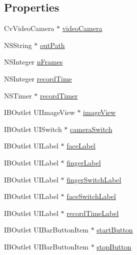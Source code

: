 \subsection*{Properties}
\begin{DoxyCompactItemize}
\item 
Cv\+Video\+Camera $\ast$ \hyperlink{category_m_h_r_main_view_controller_07_08_a82652cbbdc0ac312a50c591870b579c1}{video\+Camera}
\item 
N\+S\+String $\ast$ \hyperlink{category_m_h_r_main_view_controller_07_08_acf930d5712d9bba15886bab49c00f36c}{out\+Path}
\item 
N\+S\+Integer \hyperlink{category_m_h_r_main_view_controller_07_08_aff8ddd68733b8b626fc832ebf2390398}{n\+Frames}
\item 
N\+S\+Integer \hyperlink{category_m_h_r_main_view_controller_07_08_ac15f6b287a439206e9a1a8816248f635}{record\+Time}
\item 
N\+S\+Timer $\ast$ \hyperlink{category_m_h_r_main_view_controller_07_08_a1f1639552968eeba13ed2b4575bea129}{record\+Timer}
\item 
I\+B\+Outlet U\+I\+Image\+View $\ast$ \hyperlink{category_m_h_r_main_view_controller_07_08_ad4a109ef255380e19bcda3c2efb2ce83}{image\+View}
\item 
I\+B\+Outlet U\+I\+Switch $\ast$ \hyperlink{category_m_h_r_main_view_controller_07_08_a64545a3386e0d53f59af539582caafd4}{camera\+Switch}
\item 
I\+B\+Outlet U\+I\+Label $\ast$ \hyperlink{category_m_h_r_main_view_controller_07_08_a2457cf5b05fac6f6cb9483997159f5f6}{face\+Label}
\item 
I\+B\+Outlet U\+I\+Label $\ast$ \hyperlink{category_m_h_r_main_view_controller_07_08_a67cd700e56983a4a3a1e6da4569bafe9}{finger\+Label}
\item 
I\+B\+Outlet U\+I\+Label $\ast$ \hyperlink{category_m_h_r_main_view_controller_07_08_a1419b93d2152551aec5038ff468f3ff6}{finger\+Switch\+Label}
\item 
I\+B\+Outlet U\+I\+Label $\ast$ \hyperlink{category_m_h_r_main_view_controller_07_08_addd32f0cbd1a4d5bfe69a837b3505ed6}{face\+Switch\+Label}
\item 
I\+B\+Outlet U\+I\+Label $\ast$ \hyperlink{category_m_h_r_main_view_controller_07_08_a63bbbfafd497288fe3035250ab5d9fcb}{record\+Time\+Label}
\item 
I\+B\+Outlet U\+I\+Bar\+Button\+Item $\ast$ \hyperlink{category_m_h_r_main_view_controller_07_08_a98273435af4fbcd1e437f257bb9ced12}{start\+Button}
\item 
I\+B\+Outlet U\+I\+Bar\+Button\+Item $\ast$ \hyperlink{category_m_h_r_main_view_controller_07_08_a0e349ec3fa2cecae6592c8d9489dedfe}{stop\+Button}
\end{DoxyCompactItemize}


